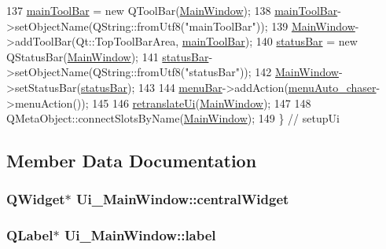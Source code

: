 \begin{DoxyCode}
137         \hyperlink{class_ui___main_window_a5172877001c8c7b4e0f6de50421867d1}{mainToolBar} = \textcolor{keyword}{new} QToolBar(\hyperlink{class_main_window}{MainWindow});
138         \hyperlink{class_ui___main_window_a5172877001c8c7b4e0f6de50421867d1}{mainToolBar}->setObjectName(QString::fromUtf8(\textcolor{stringliteral}{"mainToolBar"}));
139         \hyperlink{class_main_window}{MainWindow}->addToolBar(Qt::TopToolBarArea, \hyperlink{class_ui___main_window_a5172877001c8c7b4e0f6de50421867d1}{mainToolBar});
140         \hyperlink{class_ui___main_window_a50fa481337604bcc8bf68de18ab16ecd}{statusBar} = \textcolor{keyword}{new} QStatusBar(\hyperlink{class_main_window}{MainWindow});
141         \hyperlink{class_ui___main_window_a50fa481337604bcc8bf68de18ab16ecd}{statusBar}->setObjectName(QString::fromUtf8(\textcolor{stringliteral}{"statusBar"}));
142         \hyperlink{class_main_window}{MainWindow}->setStatusBar(\hyperlink{class_ui___main_window_a50fa481337604bcc8bf68de18ab16ecd}{statusBar});
143 
144         \hyperlink{class_ui___main_window_a2be1c24ec9adfca18e1dcc951931457f}{menuBar}->addAction(\hyperlink{class_ui___main_window_a8946bc17fa5b33e1c89ef82fdacab1d8}{menuAuto\_chaser}->menuAction());
145 
146         \hyperlink{class_ui___main_window_a097dd160c3534a204904cb374412c618}{retranslateUi}(\hyperlink{class_main_window}{MainWindow});
147 
148         QMetaObject::connectSlotsByName(\hyperlink{class_main_window}{MainWindow});
149     \} \textcolor{comment}{// setupUi}
\end{DoxyCode}


\subsection{Member Data Documentation}
\subsubsection[{\texorpdfstring{central\+Widget}{centralWidget}}]{\setlength{\rightskip}{0pt plus 5cm}Q\+Widget$\ast$ Ui\+\_\+\+Main\+Window\+::central\+Widget}\hypertarget{class_ui___main_window_a30075506c2116c3ed4ff25e07ae75f81}{}\label{class_ui___main_window_a30075506c2116c3ed4ff25e07ae75f81}
\subsubsection[{\texorpdfstring{label}{label}}]{\setlength{\rightskip}{0pt plus 5cm}Q\+Label$\ast$ Ui\+\_\+\+Main\+Window\+::label}\hypertarget{class_ui___main_window_ad9c89133780f28e6efa2ec17ceb9cff5}{}\label{class_ui___main_window_ad9c89133780f28e6efa2ec17ceb9cff5}
